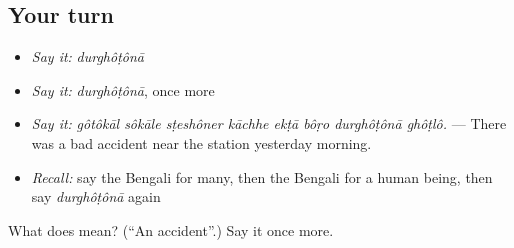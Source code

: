 \subsection*{Your turn}
\begin{itemize}
\raggedright
  \item \emph{Say it:} \emph{durghôṭônā}
  \item \emph{Say it:} \emph{durghôṭônā}, once more
  \item \emph{Say it:} \emph{gôtôkāl sôkāle sṭeshôner kāchhe ekṭā bôṛo durghôṭônā ghôṭlô.} — There was a bad accident near the station yesterday morning.
  \item \emph{Recall:} say the Bengali for many, then the Bengali for a human being, then say \emph{durghôṭônā} again
\end{itemize}

\begin{tcolorbox}[breakable,colback=teal!4,colframe=teal!35!black,title={Before you move on}]
What does  mean? (\textquotedblleft{}An accident\textquotedblright{}.) Say it once more.
\end{tcolorbox}

